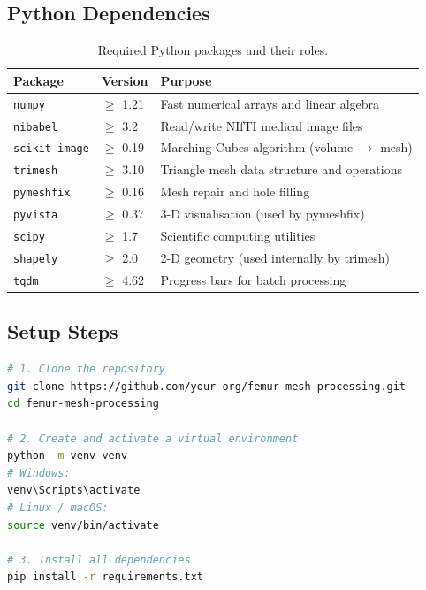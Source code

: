 \documentclass[12pt,a4paper]{article}
\begin{document}
\subsection{Python Dependencies}

\begin{table}[H]
\centering
\caption{Required Python packages and their roles.}
\begin{tabular}{@{}llp{7.5cm}@{}}
\toprule
\textbf{Package} & \textbf{Version} & \textbf{Purpose} \\
\midrule
\texttt{numpy}       & $\geq$ 1.21  & Fast numerical arrays and linear algebra \\
\texttt{nibabel}     & $\geq$ 3.2   & Read/write NIfTI medical image files \\
\texttt{scikit-image} & $\geq$ 0.19 & Marching Cubes algorithm (volume $\to$ mesh) \\
\texttt{trimesh}     & $\geq$ 3.10  & Triangle mesh data structure and operations \\
\texttt{pymeshfix}   & $\geq$ 0.16  & Mesh repair and hole filling \\
\texttt{pyvista}     & $\geq$ 0.37  & 3-D visualisation (used by pymeshfix) \\
\texttt{scipy}       & $\geq$ 1.7   & Scientific computing utilities \\
\texttt{shapely}     & $\geq$ 2.0   & 2-D geometry (used internally by trimesh) \\
\texttt{tqdm}        & $\geq$ 4.62  & Progress bars for batch processing \\
\bottomrule
\end{tabular}
\end{table}

\subsection{Setup Steps}

\begin{lstlisting}[language=bash,style=pythonstyle]
# 1. Clone the repository
git clone https://github.com/your-org/femur-mesh-processing.git
cd femur-mesh-processing

# 2. Create and activate a virtual environment
python -m venv venv
# Windows:
venv\Scripts\activate
# Linux / macOS:
source venv/bin/activate

# 3. Install all dependencies
pip install -r requirements.txt
\end{lstlisting}


\end{document}
